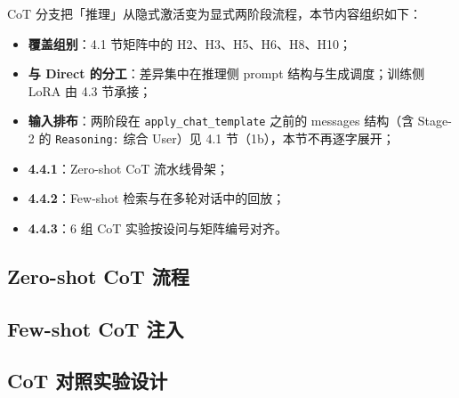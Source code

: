 
CoT 分支把「推理」从隐式激活变为显式两阶段流程，本节内容组织如下：
\begin{itemize}
    \item \textbf{覆盖组别}：4.1 节矩阵中的 H2、H3、H5、H6、H8、H10；
    \item \textbf{与 Direct 的分工}：差异集中在推理侧 prompt 结构与生成调度；训练侧 LoRA 由 4.3 节承接；
    \item \textbf{输入排布}：两阶段在 \texttt{apply\_chat\_template} 之前的 messages 结构（含 Stage-2 的 \texttt{Reasoning:} 综合 User）见 4.1 节（1b），本节不再逐字展开；
    \item \textbf{4.4.1}：Zero-shot CoT 流水线骨架；
    \item \textbf{4.4.2}：Few-shot 检索与在多轮对话中的回放；
    \item \textbf{4.4.3}：6 组 CoT 实验按设问与矩阵编号对齐。
\end{itemize}

\subsection{Zero-shot CoT 流程}


\subsection{Few-shot CoT 注入}


\subsection{CoT 对照实验设计}
